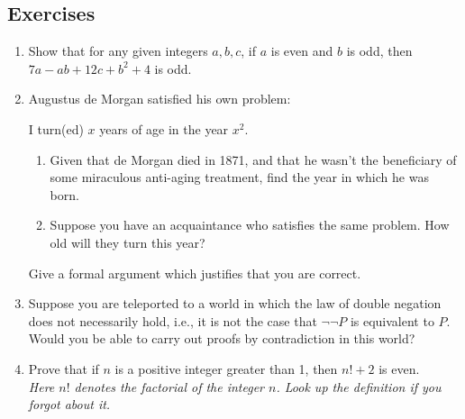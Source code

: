 \subsection*{Exercises}\renewcommand{\labelenumi}{\thesubsection.\theenumi}
\begin{enumerate}
	\item Show that for any given integers $a,b,c$, if $a$ is even and $b$ is odd, then $7a-ab+12c+b^2+4$ is odd.
	
  \item Augustus de Morgan satisfied his own problem:\prelistskip
	\begin{center}
	I turn(ed) $x$ years of age in the year $x^2$.\prelistskip
	\end{center}
	\begin{enumerate}
	  \item Given that de Morgan died in 1871, and that he wasn't the beneficiary of some miraculous anti-aging treatment, find the year in which he was born.
	  \item Suppose you have an acquaintance who satisfies the same problem. How old will they turn this year?
	\end{enumerate}%
	Give a formal argument which justifies that you are correct.
	
    
    
    \item Suppose you are teleported to a world in which the law of double negation does not necessarily hold, i.e., it is not the case that $\neg \neg P$ is equivalent to $P$. Would you be able to carry out proofs by contradiction in this world?
	
	\item Prove that if $n$ is a positive integer greater than 1, then $n!+2$ is even.\\[5pt]
  \emph{Here $n!$ denotes the \emph{factorial} of the integer $n$. Look up the definition if you forgot about it.}
  

\end{enumerate}
